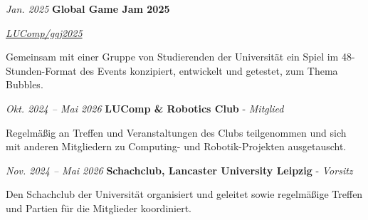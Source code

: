 \documentclass[german]{cv}
\begin{document}
        \vspace{0.13 cm}

        \begin{twocolentry}{
        \textit{Jan. 2025}}
            \textbf{Global Game Jam 2025}

            \textit{\href{https://github.com/LUComp/ggj2025}{LUComp/ggj2025}}
        \end{twocolentry}

        \vspace{0.10 cm}
        \begin{onecolentry}
            \begin{highlights}
                \item Gemeinsam mit einer Gruppe von Studierenden der Universität ein Spiel im 48-Stunden-Format des Events konzipiert, entwickelt und getestet, zum Thema \glqq Bubbles\grqq.
            \end{highlights}
        \end{onecolentry}

        \vspace{0.13 cm}

        \begin{twocolentry}{
        \textit{Okt. 2024 – Mai 2026}}
            \textbf{LUComp \& Robotics Club} - \textit{Mitglied}
        \end{twocolentry}

        \vspace{0.10 cm}
        \begin{onecolentry}
            \begin{highlights}
                \item Regelmäßig an Treffen und Veranstaltungen des Clubs teilgenommen und sich mit anderen Mitgliedern zu Computing- und Robotik-Projekten ausgetauscht.
            \end{highlights}
        \end{onecolentry}

        \vspace{0.13 cm}

        \begin{twocolentry}{
        \textit{Nov. 2024 – Mai 2026}}
            \textbf{Schachclub, Lancaster University Leipzig} - \textit{Vorsitz}
        \end{twocolentry}

        \vspace{0.10 cm}
        \begin{onecolentry}
            \begin{highlights}
                \item Den Schachclub der Universität organisiert und geleitet sowie regelmäßige Treffen und Partien für die Mitglieder koordiniert.
            \end{highlights}
        \end{onecolentry}
\end{document}
